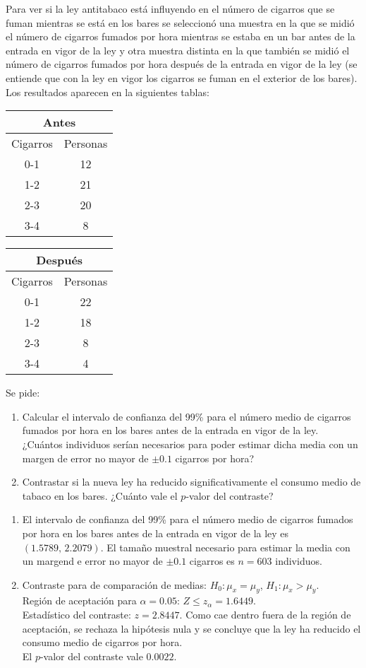 {Para ver si la ley antitabaco está influyendo en el número de cigarros que se fuman mientras se está en los bares se
seleccionó una muestra en la que se midió el número de cigarros fumados por hora mientras se estaba en un bar antes de la entrada en vigor de la ley y otra
muestra distinta en la que también se midió el número de cigarros fumados por hora después de la entrada en vigor de la ley (se entiende
que con la ley en vigor los cigarros se fuman en el exterior de los bares). Los resultados aparecen en la siguientes tablas:
\begin{center}
\begin{tabular}{cc}
\multicolumn{2}{c}{Antes}\\
\hline
Cigarros & Personas \\
\hline
0-1 & 12\\
1-2 & 21\\
2-3 & 20\\
3-4 & 8\\
\hline
\end{tabular}
\qquad
\begin{tabular}{cc}
\multicolumn{2}{c}{Después}\\
\hline
Cigarros & Personas \\
\hline
0-1 & 22\\
1-2 & 18\\
2-3 & 8\\
3-4 & 4\\
\hline
\end{tabular}
\end{center}
Se pide:
\begin{enumerate}
\item Calcular el intervalo de confianza del 99\% para el número medio de cigarros fumados por hora en los bares antes de la entrada en
vigor de la ley. ¿Cuántos individuos serían necesarios para poder estimar dicha media con un margen de error no mayor de $\pm 0.1$ cigarros
por hora?
\item Contrastar si la nueva ley ha reducido significativamente el consumo medio de tabaco en los bares. ¿Cuánto vale el $p$-valor del
contraste?
\end{enumerate}
}
{\begin{enumerate}
\item El intervalo de confianza del 99\% para el número medio de cigarros fumados por hora en los bares antes de la entrada en vigor de la
ley es $(1.5789,\,2.2079)$. El tamaño muestral necesario para estimar la media con un margend e error no mayor de $\pm 0.1$ cigarros es
$n=603$ individuos.
\item Contraste para de comparación de medias: $H_0:\mu_x=\mu_y$, $H_1:\mu_x> \mu_y$.\\
Región de aceptación para $\alpha=0.05$: $Z\leq z_\alpha=1.6449$.\\
Estadístico del contraste: $z= 2.8447$. Como cae dentro fuera de la región de aceptación, se rechaza la hipótesis nula y se concluye que la
ley ha reducido el consumo medio de cigarros por hora.\\
El $p$-valor del contraste vale $0.0022$.
\end{enumerate}
}
